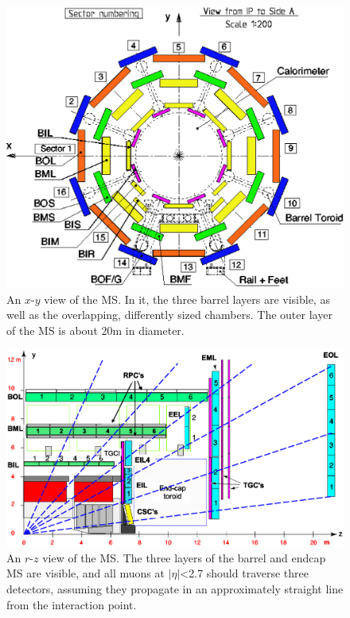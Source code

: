 \begin{centering}
\begin{figure}[bth]
\myfloatalign
\includegraphics[width=.90\linewidth]{figures/atlas/Muon_sector_numbering.eps}
\caption{An $x$-$y$ view of the \ac{MS}. In it, the three barrel layers are visible, as well as the overlapping, differently sized chambers. The outer layer of the \ac{MS} is about 20m in diameter.}
\label{fig:muon_xy}
\end{figure}
\end{centering}

\begin{centering}
\begin{figure}[bth]
\myfloatalign
\includegraphics[width=.90\linewidth]{figures/atlas/Muon_rz_large_sect_6.eps}
\caption{An $r$-$z$ view of the \ac{MS}. The three layers of the barrel and endcap \ac{MS} are visible, and all muons at $|\eta|$<2.7 should traverse three detectors, assuming they propagate in an approximately straight line from the interaction point.}
\label{fig:muon_rz}
\end{figure}
\end{centering}

